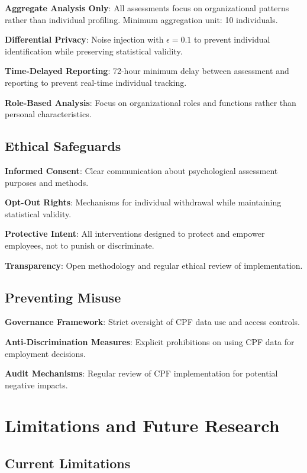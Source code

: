 \documentclass[11pt,a4paper]{article}
\begin{document}
\textbf{Aggregate Analysis Only}: All assessments focus on organizational patterns rather than individual profiling. Minimum aggregation unit: 10 individuals.

\textbf{Differential Privacy}: Noise injection with $\epsilon = 0.1$ to prevent individual identification while preserving statistical validity.

\textbf{Time-Delayed Reporting}: 72-hour minimum delay between assessment and reporting to prevent real-time individual tracking.

\textbf{Role-Based Analysis}: Focus on organizational roles and functions rather than personal characteristics.

\subsection{Ethical Safeguards}

\textbf{Informed Consent}: Clear communication about psychological assessment purposes and methods.

\textbf{Opt-Out Rights}: Mechanisms for individual withdrawal while maintaining statistical validity.

\textbf{Protective Intent}: All interventions designed to protect and empower employees, not to punish or discriminate.

\textbf{Transparency}: Open methodology and regular ethical review of implementation.

\subsection{Preventing Misuse}

\textbf{Governance Framework}: Strict oversight of CPF data use and access controls.

\textbf{Anti-Discrimination Measures}: Explicit prohibitions on using CPF data for employment decisions.

\textbf{Audit Mechanisms}: Regular review of CPF implementation for potential negative impacts.

\section{Limitations and Future Research}

\subsection{Current Limitations}
\end{document}
